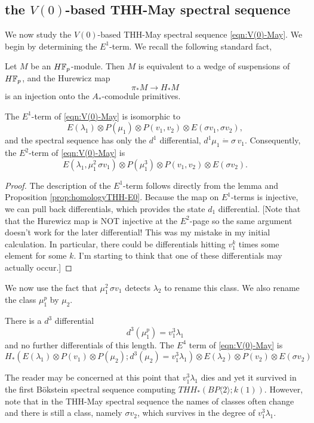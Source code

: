 \subsection{the $V(0)$-based THH-May spectral sequence}


We now study the $V(0)$-based THH-May spectral sequence \eqref{eqn:V(0)-May}. We begin by determining the $E^1$-term. We recall the following standard fact, 

\begin{lem}
	Let $M$ be an $H\mathbb{F}_p$-module. Then $M$ is equivalent to a wedge of suspensions of $H\mathbb{F}_p$, and the Hurewicz map 
	\[
	\pi_*M\to H_*M
	\]
	is an injection onto the $A_*$-comodule primitives.
\end{lem}

\begin{prop}
	The $E^1$-term of \eqref{eqn:V(0)-May} is isomorphic to 
	\[
	E(\lambda_1)\otimes P(\mu_1)\otimes P(v_1,v_2)\otimes E(\sigma v_1, \sigma v_2),
	\]
	and the spectral sequence has only the $d^1$ differential, $d^1\mu_1 \dot{=} \sigma\, v_1$. Consequently, the $E^2$-term of \eqref{eqn:V(0)-May} is 
	\[ E(\lambda_1, \mu_1^2\, \sigma v_1)\otimes P(\mu_1^3)\otimes P(v_1,v_2)\otimes E(\sigma v_2). \]
\end{prop}
\begin{proof}
	The description of the $E^1$-term follows directly from the lemma and Proposition \ref{prop:homologyTHH-E0}. 
	Because the map on $E^1$-terms is injective, we can pull back differentials, which provides the state $d_1$ differential. [Note that that the Hurewicz map is NOT injective at the $E^2$-page so the same argument doesn't work for the later differential! This was my mistake in my initial calculation. In particular, there could be differentials hitting $v_1^k$ times some element for some $k$. I'm starting to think that one of these differentials may actually occur.]
\end{proof}
We now use the fact that $\mu_1^2\, \sigma v_1$ detects $\lambda_2$ to rename this class. We also rename the class $\mu_1^p$ by $\mu_2$. 
\begin{prop}
	There is a $d^3$ differential 
	\[ d^3(\mu_1^p)=v_1^3\lambda_1 \]
	and no further differentials of this length. 
	The $E^{4}$ term of \eqref{eqn:V(0)-May} is 
	\[ H_*(E(\lambda_1)\otimes P(v_1)\otimes P(\mu_2 ); d^3(\mu_2)=v_1^3\lambda_1)\otimes E(\lambda_2)\otimes P(v_2)\otimes E(\sigma v_2) \]
\end{prop}
The reader may be concerned at this point that $v_1^3\lambda_1$ dies and yet it survived in the first B\"okstein spectral sequence computing $THH_*(BP\langle 2\rangle ; k(1))$. However, note that in the THH-May spectral sequence the names of classes often change and there is still a class, namely $\sigma v_2$, which survives in the degree of $v_1^3\lambda_1$. 

